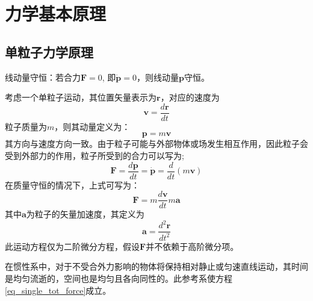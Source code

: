 \chapter{力学基本原理}

\section{单粒子力学原理}
\begin{theorem}[单粒子守恒原理]
	线动量守恒：若合力$\bm{F} = 0$, 即$\dot{\bm{p}} = 0$，则线动量$\bm{p}$守恒。
\end{theorem}
考虑一个单粒子运动，其位置矢量表示为$\bm{r}$，对应的速度为
\begin{equation}
  \bm{v} = \frac{d \bm{r}}{d t} \label{eq_single_velocity}
\end{equation}
粒子质量为$m$，则其动量定义为：
\begin{equation}
  \bm{p} = m \bm{v}   \label{eq_single_momentum}
\end{equation}
其方向与速度方向一致。由于粒子可能与外部物体或场发生相互作用，因此粒子会受到外部力的作用，粒子所受到的合力可以写为;
\begin{equation}
  \bm{F} = \frac{d \bm{p}}{dt} = \dot{\bm{p}} = \frac{d }{dt}(m\bm{v})  \label{eq_single_tot_force}
\end{equation}
在质量守恒的情况下，上式可写为：
\begin{equation}
  \bm{F} = m \frac{d\bm{v}}{dt} m \bm{a}
\end{equation}
其中$\bm{a}$为粒子的矢量加速度，其定义为
\begin{equation}
	\bm{a} = \frac{d^2 \bm{r}}{dt^2}
\end{equation}
此运动方程仅为二阶微分方程，假设$\bm{F}$并不依赖于高阶微分项。
\begin{definition}
	在惯性系中，对于不受合外力影响的物体将保持相对静止或匀速直线运动，其时间是均匀流逝的，空间也是均匀且各向同性的。此参考系使方程\eqref{eq_single_tot_force}成立。
\end{definition}


